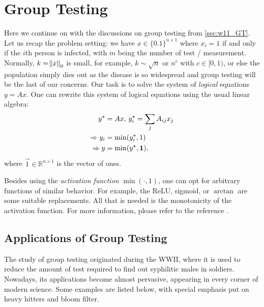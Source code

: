 \section{Group Testing} \label{sec:w12_GT}

Here we continue on with the discussions on group testing from \autoref{sec:w11_GT}. Let us recap the problem setting: we have $x\in\{0.1\}^{n\times1}$ where $x_i=1$ if and only if the $i$th person is infected, with $m$ being the number of test / measurement. Normally, $k=\norm{x}_0$ is small, for example, $k\sim\sqrt{n}$ or $n^c$ with $c\in[0,1)$, or else the population simply dies out as the disease is so widespread and group testing will be the last of our concerns. Our task is to solve the system of \textit{logical} equations $y=Ax$. One can rewrite this system of logical equations using the usual linear algebra:
\begin{align}
    y^\star &= Ax,\, y^\star_i = \sum_{j}A_{ij}x_j \notag\\
    \Rightarrow y_i &= \min(y^\star_i,1) \\
    \Rightarrow y &= \min(y^\star,\vec{1}),
\end{align}
where $\vec{1}\in\mathbb{R}^{n\times1}$ is the vector of ones.

Besides using the \textit{activation function} $\min(\cdot,1)$, one can opt for arbitrary functions of similar behavior. For example, the ReLU, sigmoid, or $\arctan$ are some suitable replacements. All that is needed is the monotonicity of the activation function. For more information, please refer to the reference \cite{Generalized_Group_Testing}.

\subsection{Applications of Group Testing}
The study of group testing originated during the WWI\!I, where it is used to reduce the amount of test required to find out syphilitic males in soldiers. Nowadays, its applications become almost pervasive, appearing in every corner of modern science. Some examples are listed below, with special emphasis put on heavy hitters and bloom filter.

